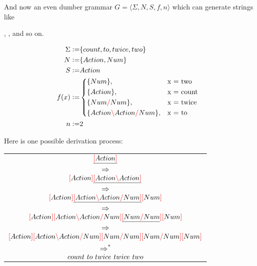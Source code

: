 \documentclass[main.tex]{subfiles}
\begin{document}
\begin{example}
    \label{ex:derivsimple}

    And now an even dumber grammar $G = \langle \Sigma, N, S, f, n \rangle$
    which can generate strings like 
    
    ,
    , 
    and so on.

    \begin{align*}
        \Sigma \defeq& \{ count, to, twice, two \} \\
        N \defeq& \{ Action, Num \} \\
        S \defeq& Action \\
        f(x) \defeq&
            \begin{cases*}
                \{ Num \},& x = two \\
                \{ Action \},& x = count \\
                \{ Num \rc Num \},& x = twice \\
                \{ Action \lc Action \rc Num \},& x = to \\
            \end{cases*} \\
        n \defeq& 2 \\
    \end{align*}

    Here is one possible derivation process:
    \begin{center}
        \begin{tabular}{c}
            $\underline{\textcolor{red}{[} Action \textcolor{red}{]}}$ \\ $\Rightarrow$ \\
            $\textcolor{red}{[} Action \textcolor{red}{]} \underline{\textcolor{red}{[} Action \textcolor{red}{\backslash} Action \textcolor{red}{]}}$ \\ $\Rightarrow$ \\
            $\textcolor{red}{[} Action \textcolor{red}{]} \underline{\textcolor{red}{[} Action \textcolor{red}{\backslash} Action \textcolor{red}{/} Num \textcolor{red}{]}} \textcolor{red}{[} Num \textcolor{red}{]}$ \\ $\Rightarrow$ \\
            $\textcolor{red}{[} Action \textcolor{red}{]} \textcolor{red}{[} Action \textcolor{red}{\backslash} Action \textcolor{red}{/} Num \textcolor{red}{]} \underline{\textcolor{red}{[} Num \textcolor{red}{/} Num} \textcolor{red}{]} \textcolor{red}{[} Num \textcolor{red}{]}$ \\ $\Rightarrow$ \\
            $\textcolor{red}{[} Action \textcolor{red}{]} \textcolor{red}{[} Action \textcolor{red}{\backslash} Action \textcolor{red}{/} Num \textcolor{red}{]} \textcolor{red}{[} Num \textcolor{red}{/} Num \textcolor{red}{]} \textcolor{red}{[} Num \textcolor{red}{/} Num \textcolor{red}{]} \textcolor{red}{[} Num \textcolor{red}{]}$ \\ $\Rightarrow^*$ \\
            $count \text{ } to \text{ } twice \text{ } twice \text{ } two$ \\
        \end{tabular}
    \end{center}
\end{example}
\end{document}
